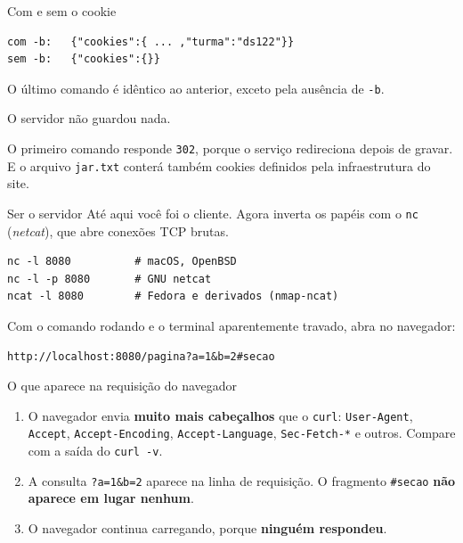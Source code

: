 \documentclass{beamer}
\begin{document}
\begin{frame}[fragile]{Com e sem o cookie}
  \begin{verbatim}
com -b:   {"cookies":{ ... ,"turma":"ds122"}}
sem -b:   {"cookies":{}}
  \end{verbatim}

  \vspace{0.4cm}
  O último comando é idêntico ao anterior, exceto pela ausência de \texttt{-b}.

  \begin{center}
    \Large O servidor não guardou nada.
  \end{center}

  \vspace{0.3cm}
  \footnotesize
  O primeiro comando responde \texttt{302}, porque o serviço redireciona depois
  de gravar. E o arquivo \texttt{jar.txt} conterá também cookies definidos pela
  infraestrutura do site.
\end{frame}

\begin{frame}[fragile]{Ser o servidor}
  Até aqui você foi o cliente. Agora inverta os papéis com o \texttt{nc}
  (\textit{netcat}), que abre conexões TCP brutas.

  \begin{verbatim}
nc -l 8080          # macOS, OpenBSD
nc -l -p 8080       # GNU netcat
ncat -l 8080        # Fedora e derivados (nmap-ncat)
  \end{verbatim}

  Com o comando rodando e o terminal aparentemente travado, abra no navegador:

  \begin{verbatim}
http://localhost:8080/pagina?a=1&b=2#secao
  \end{verbatim}
\end{frame}

\begin{frame}{O que aparece na requisição do navegador}
  \begin{enumerate}
    \item O navegador envia \textbf{muito mais cabeçalhos} que o \texttt{curl}:
          \texttt{User-Agent}, \texttt{Accept}, \texttt{Accept-Encoding},
          \texttt{Accept-Language}, \texttt{Sec-Fetch-*} e outros.
          Compare com a saída do \texttt{curl -v}.

    \item A consulta \texttt{?a=1\&b=2} aparece na linha de requisição.
          O fragmento \texttt{\#secao} \textbf{não aparece em lugar nenhum}.

    \item O navegador continua carregando, porque \textbf{ninguém respondeu}.
  \end{enumerate}
\end{frame}
\end{document}
